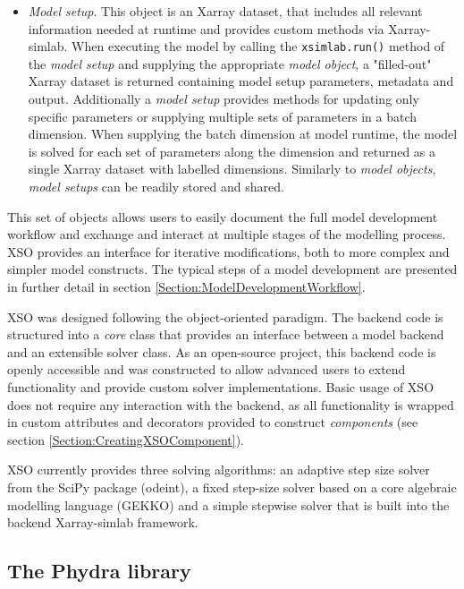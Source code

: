 \documentclass[journal abbreviation, manuscript]{copernicus}
\begin{document}
\begin{itemize}
    \item \textit{Model setup}. This object is an Xarray dataset, that includes all relevant information needed at runtime and provides custom methods via Xarray-simlab. When executing the model by calling the \texttt{xsimlab.run()} method of the \textit{model setup} and supplying the appropriate \textit{model object}, a "filled-out" Xarray dataset is returned containing model setup parameters, metadata and output. Additionally a \textit{model setup} provides methods for updating only specific parameters or supplying multiple sets of parameters in a batch dimension. When supplying the batch dimension at model runtime, the model is solved for each set of parameters along the dimension and returned as a single Xarray dataset with labelled dimensions. Similarly to \textit{model objects}, \textit{model setups} can be readily stored and shared.
\end{itemize}

This set of objects allows users to easily document the full model development workflow and exchange and interact at multiple stages of the modelling process. XSO provides an interface for iterative modifications, both to more complex and simpler model constructs. The typical steps of a model development are presented in further detail in section \ref{Section:ModelDevelopmentWorkflow}.

XSO was designed following the object-oriented paradigm. The backend code is structured into a \textit{core} class that provides an interface between a model backend and an extensible solver class. As an open-source project, this backend code is openly accessible and was constructed to allow advanced users to extend functionality and provide custom solver implementations. Basic usage of XSO does not require any interaction with the backend, as all functionality is wrapped in custom attributes and decorators provided to construct \textit{components} (see section \ref{Section:CreatingXSOComponent}). 

XSO currently provides three solving algorithms: an adaptive step size solver from the SciPy package (odeint), a fixed step-size solver based on a core algebraic modelling language (GEKKO) and a simple stepwise solver that is built into the backend Xarray-simlab framework.


\subsection{The Phydra library} \label{Section:PhydraLibrary}
\end{document}
